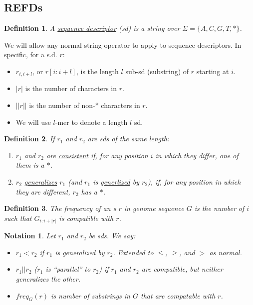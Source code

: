 \documentclass{article}
\newcommand{\und}{\underline}
\newtheorem{notation}{Notation}
\newtheorem{definition}{Definition}
\begin{document}
\subsection{REFDs}

\begin{definition}
  A \underline{sequence descriptor} (sd) is a string over $\Sigma=\{A,C,G,T,*\}$.
\end{definition}

We will allow any normal string operator to apply to sequence descriptors.  In specific, for a s.d. $r$:
\begin{itemize}
\item $r_{i,i+l}$, or $r[i:i+l]$, is the length $l$ sub-sd (substring) of $r$ starting at $i$.
\item $|r|$ is the number of characters in $r$.
\item $||r||$ is the number of non-* characters in $r$.
\item We will use $l$-mer to denote a length $l$ sd.
\end{itemize}

\begin{definition}
  If $r_1$ and $r_2$ are sds of the same length:
\begin{enumerate}
\item $r_1$ and $r_2$ are \und{consistent} if, for any position $i$ in
  which they differ, one of them is a $*$. 
\item $r_2$ \und{generalizes} $r_1$ (and $r_1$ is \und{generlized} by $r_2$),
  if, for any position in which they are different, $r_2$ has a $*$.
  \end{enumerate}
\end{definition}

\begin{definition}
  The frequency of an s $r$ in genome sequence $G$ is the number of
  $i$ such that $G_{i:i+|r|}$ is compatible with $r$.  
\end{definition}


\begin{notation}
Let $r_1$ and $r_2$ be sds.  We say:
\begin{itemize}
\item $r_1 < r_2$ if $r_1$ is generalized by $r_2$.  Extended to
  $\leq$, $\geq$, and $>$ as normal. 
\item $r_1 || r_2$ ($r_1$ is ``parallel'' to $r_2$) if $r_1$ and $r_2$ are
  compatible, but neither generalizes the other.
\item $freq_G(r)$ is number of substrings in $G$ that are compatable with $r$.
\end{itemize}
\end{notation}
\end{document}
